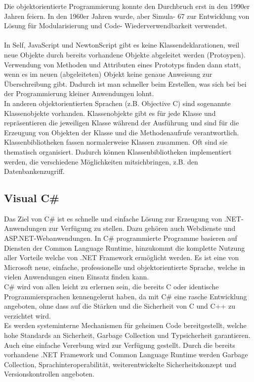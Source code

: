 \documentclass[12pt,a4paper]{report}
\begin{document}
\begin{onehalfspace}
Die objektorientierte Programmierung konnte den Durchbruch erst in den 1990er Jahren feiern. In den 1960er Jahren wurde, aber Simula- 67 zur Entwicklung von Lösung für Modularisierung und Code- Wiederverwendbarkeit verwendet.\\
\\In Self, JavaScript und NewtonScript gibt es keine Klassendeklarationen, weil neue Objekte durch bereits vorhandene Objekte abgeleitet werden (Protoypen). Verwendung von Methoden und Attributen eines Prototyps finden dann statt, wenn es im neuen (abgeleiteten) Objekt keine genaue Anweisung zur Überschreibung gibt. Dadurch ist man schneller beim Erstellen, was sich bei bei der Programmierung kleiner Anwendungen lohnt.\\

In anderen objektorientierten Sprachen (z.B. Objective C) sind sogenannte Klassenobjekte vorhanden. Klassenobjekte gibt es für jede Klasse und repräsentieren die jeweiligen Klasse während der Ausführung und sind für die Erzeugung von Objekten der Klasse und die Methodenaufrufe verantwortlich.\\

Klassenbibliotheken fassen normalerweise Klassen zusammen. Oft sind sie thematisch organisiert. Dadurch können Klassenbibliotheken implementiert werden, die verschiedene Möglichkeiten mitsichbringen, z.B. den Datenbankenzugriff.

\subsection{Visual C\#}
Das Ziel von C\# ist es schnelle und einfache Lösung zur Erzeugung von .NET-Anwendungen zur Verfügung zu stellen. Dazu gehören auch Webdienste und ASP.NET-Webanwendungen. In C\# programmierte Programme basieren auf Diensten der Common Language Runtime, hinzukommt die komplette Nutzung aller Vorteile welche von .NET Framework ermöglicht werden. Es ist eine von Microsoft neue, einfache, professionelle und objektorientierte Sprache, welche in vielen Anwendungen einen Einsatz finden kann.\\

C\# wird von allen leicht zu erlernen sein, die bereits C oder identische Programmiersprachen kennengelernt haben, da mit C\# eine rasche Entwicklung angeboten, ohne dass auf die Stärken und die Sicherheit von C und C++ zu verzichtet wird.\\

Es werden systeminterne Mechanismen für geheimen Code bereitgestellt, welche hohe Standards an Sicherheit, Garbage Collection und Typsicherheit garantieren.
\\Auch eine einfache Vererbung wird zur Verfügung gestellt. Durch die bereits vorhandene .NET Framework und Common Language Runtime werden Garbage Collection, Sprachinteroperabilität, weiterentwickelte Sicherheitskonzept und Versionskontrollen angeboten.


\end{onehalfspace}
\end{document}
